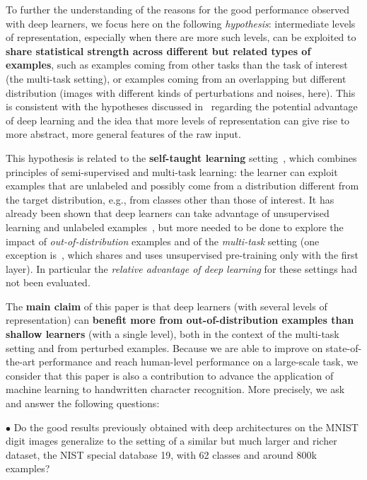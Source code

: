 \documentclass{article} %
\begin{document}
To further the understanding of the reasons for the good performance
observed with deep learners, we focus here on the following {\em hypothesis}:
intermediate levels of representation, especially when there are
more such levels, can be exploited to {\bf share
statistical strength across different but related types of examples},
such as examples coming from other tasks than the task of interest
(the multi-task setting), or examples coming from an overlapping
but different distribution (images with different kinds of perturbations
and noises, here). This is consistent with the hypotheses discussed
in~\citet{Bengio-2009} regarding the potential advantage
of deep learning and the idea that more levels of representation can
give rise to more abstract, more general features of the raw input.

This hypothesis is related to the
{\bf self-taught learning} setting~\citep{RainaR2007}, which combines principles
of semi-supervised and multi-task learning: the learner can exploit examples
that are unlabeled and possibly come from a distribution different from the target
distribution, e.g., from classes other than those of interest. 
It has already been shown that deep learners can take advantage of
unsupervised learning and unlabeled examples~\citep{Bengio-2009,WestonJ2008-small},
but more needed to be done to explore the impact
of {\em out-of-distribution} examples and of the {\em multi-task} setting
(one exception is~\citep{CollobertR2008}, which shares and uses unsupervised
pre-training only with the first layer). In particular the {\em relative
advantage of deep learning} for these settings had not been evaluated.


%
The {\bf main claim} of this paper is that deep learners (with several levels of representation) can
{\bf benefit more from out-of-distribution examples than shallow learners} (with a single
level), both in the context of the multi-task setting and from
 perturbed examples. Because we are able to improve on state-of-the-art
performance and reach human-level performance
on a large-scale task, we consider that this paper is also a contribution
to advance the application of machine learning to handwritten character recognition.
More precisely, we ask and answer the following questions:

$\bullet$ %
Do the good results previously obtained with deep architectures on the
MNIST digit images generalize to the setting of a similar but much larger and richer
dataset, the NIST special database 19, with 62 classes and around 800k examples?
\end{document}

